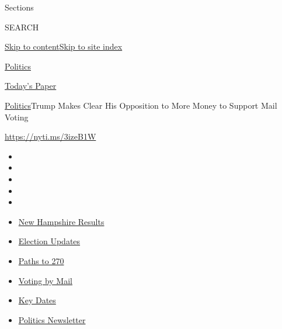 Sections

SEARCH

\protect\hyperlink{site-content}{Skip to
content}\protect\hyperlink{site-index}{Skip to site index}

\href{https://www.nytimes3xbfgragh.onion/section/politics}{Politics}

\href{https://myaccount.nytimes3xbfgragh.onion/auth/login?response_type=cookie\&client_id=vi}{}

\href{https://www.nytimes3xbfgragh.onion/section/todayspaper}{Today's
Paper}

\href{/section/politics}{Politics}\textbar{}Trump Makes Clear His
Opposition to More Money to Support Mail Voting

\url{https://nyti.ms/3izeB1W}

\begin{itemize}
\item
\item
\item
\item
\item
\end{itemize}

\begin{itemize}
\item
  \href{https://www.nytimes3xbfgragh.onion/interactive/2020/09/08/us/elections/results-new-hampshire-primary-elections.html?action=click\&pgtype=Article\&state=default\&region=TOP_BANNER\&context=storylines_menu}{New
  Hampshire Results}
\item
  \href{https://www.nytimes3xbfgragh.onion/live/2020/09/08/us/trump-vs-biden?action=click\&pgtype=Article\&state=default\&region=TOP_BANNER\&context=storylines_menu}{Election
  Updates}
\item
  \href{https://www.nytimes3xbfgragh.onion/interactive/2020/us/elections/election-states-biden-trump.html?action=click\&pgtype=Article\&state=default\&region=TOP_BANNER\&context=storylines_menu}{Paths
  to 270}
\item
  \href{https://www.nytimes3xbfgragh.onion/interactive/2020/08/31/us/politics/vote-by-mail-deadlines.html?action=click\&pgtype=Article\&state=default\&region=TOP_BANNER\&context=storylines_menu}{Voting
  by Mail}
\item
  \href{https://www.nytimes3xbfgragh.onion/interactive/2019/us/elections/2020-presidential-election-calendar.html?action=click\&pgtype=Article\&state=default\&region=TOP_BANNER\&context=storylines_menu}{Key
  Dates}
\item
  \href{https://www.nytimes3xbfgragh.onion/newsletters/politics?action=click\&pgtype=Article\&state=default\&region=TOP_BANNER\&context=storylines_menu}{Politics
  Newsletter}
\end{itemize}

